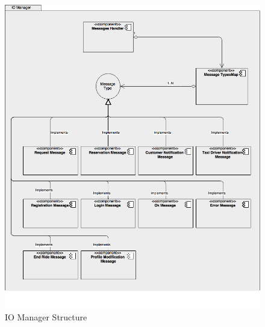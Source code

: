 \documentclass[../../../../../../../dd.tex]{subfiles}
\begin{document}
		\begin{figure}[H]
				\centering
				\includegraphics[width=\textwidth, scale=0.5]{../images/IOManager.png}
			\caption{IO Manager Structure}\label{fig:IOManager}
		\end{figure}
	
\end{document}
